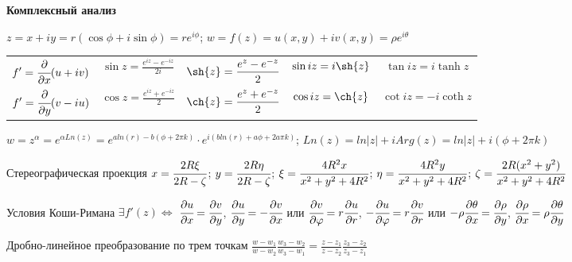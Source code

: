 \begin{center}
	\textbf{Комплексный анализ}
\end{center}
\vspace{1ex}

$\displaystyle z = x + iy = r(\cos{\phi} + i\sin{\phi}) = re^{i\phi}$;
$\displaystyle w = f(z) = u(x, y) + iv(x, y) = \rho e^{i\theta}$

\begin{tabular}{|c|c|c|c|c|}
	\hline
	$\displaystyle f'=\cfrac{\partial}{\partial x}(u + iv)$ &
	$\displaystyle \sin{z} = \frac{e^{iz} - e^{-iz}}{2i}$ &
	$\displaystyle \sh{z} = \frac{e^{z} - e^{-z}}{2}$ &
	$\displaystyle \sin{iz} = i\sh{z}$ &
	$\displaystyle \tan{iz} = i\tanh{z}$
	\\

	$\displaystyle f' = \cfrac{\partial}{\partial y}(v -iu)$ &
	$\displaystyle \cos{z} = \frac{e^{iz} + e^{-iz}}{2}$ &
	$\displaystyle \ch{z} = \frac{e^{z} + e^{-z}}{2}$ &
	$\displaystyle \cos{iz} = \ch{z}$ &
	$\cot{iz} = -i\coth{z}$
	\\
	\hline
\end{tabular}
\vspace{1ex}

\noindent
$\displaystyle w = z^\alpha = e^{\alpha Ln(z)} = e^{aln(r) - b(\phi + 2\pi k)}\cdot{e^{i(bln(r)+a\phi+2a\pi k)}}$; \hspace{1em}
$\displaystyle Ln(z) = ln|z| + iArg(z) = ln|z| + i(\phi + 2\pi k)$


\noindent
Стереографическая проекция
$\displaystyle x = \cfrac{2R\xi}{2R-\zeta}$;
$\displaystyle y = \cfrac{2R\eta}{2R-\zeta}$;
$\displaystyle \xi = \cfrac{4R^2x}{x^2+y^2+4R^2}$;
$\displaystyle \eta = \cfrac{4R^2y}{x^2+y^2+4R^2}$;
$\displaystyle \zeta = \cfrac{2R(x^2+y^2)}{x^2+y^2+4R^2}$

\noindent
Условия Коши-Римана $\displaystyle \exists f'(z) \Leftrightarrow$
$\displaystyle \cfrac{\partial u}{\partial x} = \cfrac{\partial v}{\partial y}$,
$\displaystyle \cfrac{\partial u}{\partial y} = -\cfrac{\partial v}{\partial x}$ или
$\displaystyle \cfrac{\partial v}{\partial \phi} = r\cfrac{\partial u}{\partial r}$,
$-\displaystyle \cfrac{\partial u}{\partial \phi} = r\cfrac{\partial v}{\partial r}$ или
$\displaystyle -\rho\cfrac{\partial \theta}{\partial x} = \cfrac{\partial \rho}{\partial y}$,
$\displaystyle \cfrac{\partial \rho}{\partial x} = \rho \cfrac{\partial \theta}{\partial y}$

\noindent
Дробно-линейное преобразование по трем точкам
$\displaystyle \frac{w-w_1}{w-w_2}\frac{w_3-w_2}{w_3-w_1} =
\frac{z-z_1}{z-z_2}\frac{z_3-z_2}{z_3-z_1}$

